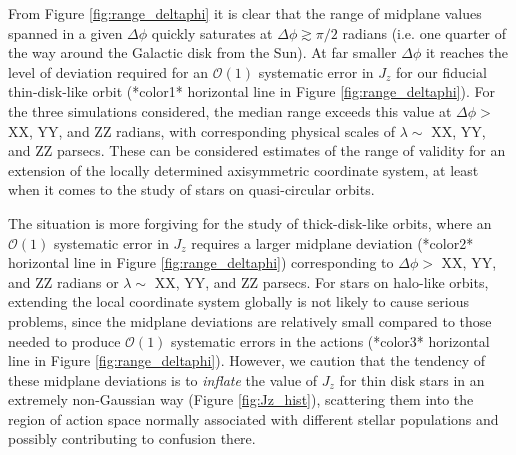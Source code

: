 \documentclass[twocolumn]{aastex62}
\begin{document}
\begin{figure*}
\caption{The range of midplane heights encountered as a function of angular
width. At each angle $\phi$ from Figure~\ref{fig:midplane} we consider an
angular width of $\Delta \phi$ centered on $\phi$ and report the range of
midplane heights within that width. We repeat the procedure for each $\phi$
and plot the result as translucent gray lines. We also plot the mean range as
a solid blue line and the $\pm1\sigma$ lines as dashed blue lines. The upper
$x$-axis shows the chord length from the position $\phi$ to $\pm\Delta\phi/2$.
A cartoon explanation of this Figure is given in
Figure~\ref{fig:fig_to_explain}.}
\label{fig:range_deltaphi}
\end{figure*}

From Figure \ref{fig:range_deltaphi} it is clear that the range of midplane
values spanned in a given $\Delta \phi$ quickly saturates at $\Delta \phi
\gtrsim \pi/2$ radians (i.e. one quarter of the way around the Galactic disk
from the Sun). At far smaller $\Delta \phi$ it reaches the level of deviation
required for an $\mathcal{O}(1)$ systematic error in $J_z$ for our fiducial
thin-disk-like orbit (*color1* horizontal line in Figure
\ref{fig:range_deltaphi}). For the three simulations considered, the median
range exceeds this value at $\Delta \phi >$ XX, YY, and ZZ radians, with
corresponding physical scales of $\lambda \sim$ XX, YY, and ZZ parsecs. These
can be considered estimates of the range of validity for an extension of the
locally determined axisymmetric coordinate system, at least when it comes to
the study of stars on quasi-circular orbits.

The situation is more forgiving for the study of thick-disk-like orbits, where
an $\mathcal{O}(1)$ systematic error in $J_z$ requires a larger midplane
deviation (*color2* horizontal line in Figure \ref{fig:range_deltaphi})
corresponding to $\Delta \phi >$ XX, YY, and ZZ radians or $\lambda \sim$ XX,
YY, and ZZ parsecs. For stars on halo-like orbits, extending the local
coordinate system globally is not likely to cause serious problems, since the
midplane deviations are relatively small compared to those needed to produce
$\mathcal{O}(1)$ systematic errors in the actions (*color3* horizontal line in
Figure \ref{fig:range_deltaphi}). However, we caution that the tendency of
these midplane deviations is to \emph{inflate} the value of $J_z$ for thin
disk stars in an extremely non-Gaussian way (Figure \ref{fig:Jz_hist}),
scattering them into the region of action space normally associated with
different stellar populations and possibly contributing to confusion there.
\end{document}

